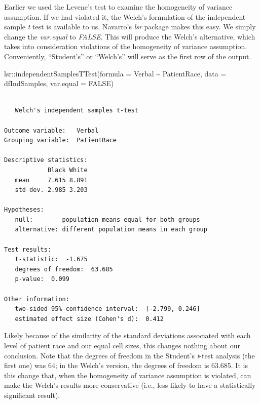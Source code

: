 \documentclass[
  11pt,
]{book}
\newenvironment{Shaded}{\begin{snugshade}}{\end{snugshade}}
\newcommand{\AttributeTok}[1]{\textcolor[rgb]{0.77,0.63,0.00}{#1}}
\newcommand{\ConstantTok}[1]{\textcolor[rgb]{0.00,0.00,0.00}{#1}}
\newcommand{\FunctionTok}[1]{\textcolor[rgb]{0.00,0.00,0.00}{#1}}
\newcommand{\NormalTok}[1]{#1}
\newcommand{\SpecialCharTok}[1]{\textcolor[rgb]{0.00,0.00,0.00}{#1}}
\begin{document}
Earlier we used the Levene's test to examine the homogeneity of variance assumption. If we had violated it, the Welch's formulation of the independent sample \emph{t} test is available to us. Navarro's \emph{lsr} package makes this easy. We simply change the \emph{var.equal} to \emph{FALSE}. This will produce the Welch's alternative, which takes into consideration violations of the homogeneity of variance assumption. Conveniently, ``Student's'' or ``Welch's'' will serve as the first row of the output.

\begin{Shaded}
\begin{Highlighting}[]
\NormalTok{lsr}\SpecialCharTok{::}\FunctionTok{independentSamplesTTest}\NormalTok{(}\AttributeTok{formula =}\NormalTok{ Verbal }\SpecialCharTok{\textasciitilde{}}\NormalTok{ PatientRace, }\AttributeTok{data =}\NormalTok{ dfIndSamples,}
    \AttributeTok{var.equal =} \ConstantTok{FALSE}\NormalTok{)}
\end{Highlighting}
\end{Shaded}

\begin{verbatim}

   Welch's independent samples t-test 

Outcome variable:   Verbal 
Grouping variable:  PatientRace 

Descriptive statistics: 
            Black White
   mean     7.615 8.891
   std dev. 2.985 3.203

Hypotheses: 
   null:        population means equal for both groups
   alternative: different population means in each group

Test results: 
   t-statistic:  -1.675 
   degrees of freedom:  63.685 
   p-value:  0.099 

Other information: 
   two-sided 95% confidence interval:  [-2.799, 0.246] 
   estimated effect size (Cohen's d):  0.412 
\end{verbatim}

Likely because of the similarity of the standard deviations associated with each level of patient race and our equal cell sizes, this changes nothing about our conclusion. Note that the degrees of freedom in the Student's \emph{t}-test analysis (the first one) was 64; in the Welch's version, the degrees of freedom is 63.685. It is this change that, when the homogeneity of variance assumption is violated, can make the Welch's results more conservative (i.e., less likely to have a statistically significant result).
\end{document}
